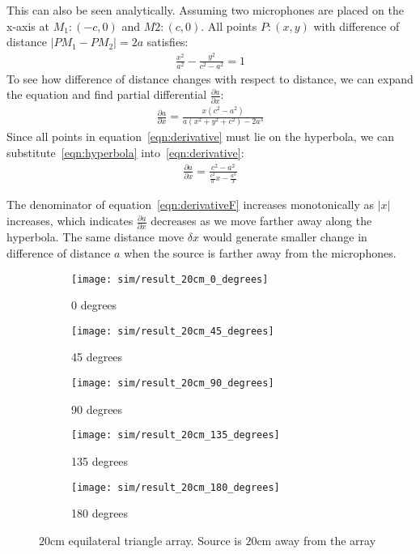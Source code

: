 This can also be seen analytically. Assuming two microphones are placed on the x-axis at $M_1:(-c,0)$ and $M2:(c,0)$. All points $P:(x,y)$ with difference of distance $ |PM_1 - PM_2| = 2a$ satisfies:
\begin{eqnarray}\label{eqn:hyperbola}
\frac{x^2}{a^2} - \frac{y^2}{c^2-a^2} = 1
\end{eqnarray}
To see how difference of distance changes with respect to distance, we can expand the equation and find partial differential $\frac{\partial a}{\partial x}$:
\begin{eqnarray}\label{eqn:derivative}
\frac{\partial a}{\partial x} = \frac{x(c^2-a^2)}{a(x^2+y^2+c^2)-2a^3}
\end{eqnarray}
Since all points in equation~\ref{eqn:derivative} must lie on the hyperbola, we can substitute~\ref{eqn:hyperbola} into~\ref{eqn:derivative}:
\begin{eqnarray}\label{eqn:derivativeF}
\frac{\partial a}{\partial x} = \frac{c^2-a^2}{\frac{c^2}{a}x - \frac{a^3}{x}}
\end{eqnarray}

The denominator of equation~\ref{eqn:derivativeF} increases monotonically as $|x|$ increases, which indicates $\frac{\partial a}{\partial x}$ decreases as we move farther away along the hyperbola. The same distance move $\delta x$ would generate smaller change in difference of distance $a$ when the source is farther away from the microphones. 

\begin{figure*}[]
  \centering
  \begin{subfigure}[]{.3\textwidth}
    \texttt{[image: sim/result\_20cm\_0\_degrees]}
    \caption{0 degrees}
  \end{subfigure}
  \begin{subfigure}[]{.3\textwidth}
    \texttt{[image: sim/result\_20cm\_45\_degrees]}
    \caption{45 degrees}
  \end{subfigure}
  \begin{subfigure}[]{.3\textwidth}
    \texttt{[image: sim/result\_20cm\_90\_degrees]}
    \caption{90 degrees}
  \end{subfigure}
  \begin{subfigure}[]{.3\textwidth}
    \texttt{[image: sim/result\_20cm\_135\_degrees]}
    \caption{135 degrees}
  \end{subfigure}
  \begin{subfigure}[]{.3\textwidth}
    \texttt{[image: sim/result\_20cm\_180\_degrees]}
    \caption{180 degrees}
  \end{subfigure}
  \caption{$20$cm equilateral triangle array. Source is $20$cm away from the array}
  \label{fig:sim_3_2}
\end{figure*}

